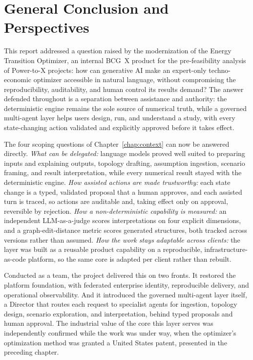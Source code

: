 \chapter*{General Conclusion and Perspectives}

This report addressed a question raised by the modernization of the Energy
Transition Optimizer, an internal BCG~X product for the pre-feasibility analysis
of Power-to-X projects: how can generative AI make an expert-only techno-economic
optimizer accessible in natural language, without compromising the
reproducibility, auditability, and human control its results demand? The answer
defended throughout is a separation between assistance and authority: the
deterministic engine remains the sole source of numerical truth, while a governed
multi-agent layer helps users design, run, and understand a study, with every
state-changing action validated and explicitly approved before it takes effect.

The four scoping questions of Chapter~\ref{chap:context} can now be answered
directly. \emph{What can be delegated:} language models proved well suited to
preparing inputs and explaining outputs, topology drafting, assumption ingestion,
scenario framing, and result interpretation, while every numerical result stayed
with the deterministic engine. \emph{How assisted actions are made trustworthy:}
each state change is a typed, validated proposal that a human approves, and each
assisted turn is traced, so actions are auditable and, taking effect only on
approval, reversible by rejection. \emph{How a non-deterministic capability is
measured:} an independent LLM-as-a-judge scores interpretations on four explicit
dimensions, and a graph-edit-distance metric scores generated structures, both
tracked across versions rather than assumed. \emph{How the work stays adaptable
across clients:} the layer was built as a reusable product capability on a
reproducible, infrastructure-as-code platform, so the same core is adapted per
client rather than rebuilt.

Conducted as a team, the project delivered this on two fronts. It restored the
platform foundation, with federated enterprise identity, reproducible delivery,
and operational observability. And it introduced the governed multi-agent layer
itself, a Director that routes each request to specialist agents for ingestion,
topology design, scenario exploration, and interpretation, behind typed proposals
and human approval. The industrial value of the core this layer serves was
independently confirmed while the work was under way, when the optimizer's
optimization method was granted a United States patent, presented in the
preceding chapter.

